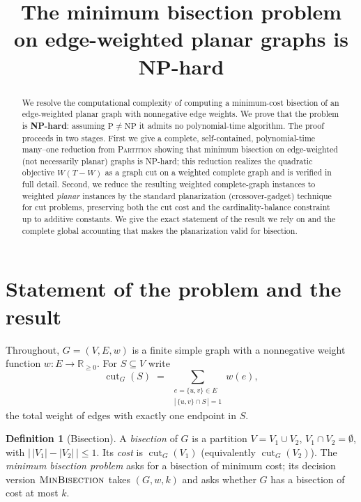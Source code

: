 \documentclass{amsart}
\theoremstyle{plain}
\theoremstyle{definition}
\newtheorem{definition}{Definition}
\theoremstyle{remark}
\newcommand{\cut}{\operatorname{cut}}
\begin{document}
\title{The minimum bisection problem on edge-weighted planar graphs is NP-hard}
\maketitle

\begin{abstract}
We resolve the computational complexity of computing a minimum-cost bisection
of an edge-weighted planar graph with nonnegative edge weights. We prove that the
problem is \textbf{NP-hard}: assuming $\mathrm{P}\neq\mathrm{NP}$ it admits no
polynomial-time algorithm. The proof proceeds in two stages. First we give a
complete, self-contained, polynomial-time many--one reduction from \textsc{Partition}
showing that minimum bisection on edge-weighted (not necessarily planar) graphs is
NP-hard; this reduction realizes the quadratic objective $W(T-W)$ as a graph cut on a
weighted complete graph and is verified in full detail. Second, we reduce the resulting
weighted complete-graph instances to weighted \emph{planar} instances by the standard
planarization (crossover-gadget) technique for cut problems, preserving both the cut
cost and the cardinality-balance constraint up to additive constants. We give the
exact statement of the result we rely on and the complete global accounting that makes
the planarization valid for bisection.
\end{abstract}

\section{Statement of the problem and the result}

Throughout, $G=(V,E,w)$ is a finite simple graph with a nonnegative weight function
$w\colon E\to\mathbb{R}_{\ge 0}$. For $S\subseteq V$ write
\[
  \cut_G(S)\;=\;\sum_{\substack{e=\{u,v\}\in E\\ |\,\{u,v\}\cap S\,|=1}} w(e),
\]
the total weight of edges with exactly one endpoint in $S$.

\begin{definition}[Bisection]\label{def:bisection}
A \emph{bisection} of $G$ is a partition $V=V_1\cup V_2$, $V_1\cap V_2=\emptyset$,
with $\bigl|\,|V_1|-|V_2|\,\bigr|\le 1$. Its \emph{cost} is $\cut_G(V_1)$
(equivalently $\cut_G(V_2)$). The \emph{minimum bisection problem} asks for a bisection
of minimum cost; its decision version $\textsc{MinBisection}$ takes $(G,w,k)$ and asks
whether $G$ has a bisection of cost at most $k$.
\end{definition}
\end{document}
